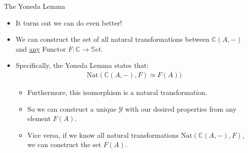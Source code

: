 \documentclass[aspectratio=169]{beamer} %
\newcommand{\bC}{\mathbb{C}}
\newcommand{\bS}{\mathbb{S}}
\newcommand{\mY}{\mathcal{Y}}
\begin{document}
\begin{frame}{The Yoneda Lemma}
    \begin{itemize}
        \item It turns out we can do even better!
        \pause\item We can construct the set of all natural transformations between $\bC(A, -)$ and \underline{any} Functor $F :\bC \to \bS et$.
        \pause\item Specifically, the Yoneda Lemma states that:
        \begin{align*}
          \text{Nat}(\bC(A,-), F) \simeq F(A))
        \end{align*}
        \begin{itemize}
          \vspace{-18pt}\pause\item Furthermore, this isomorphism is a natural transformation.
          \pause\item So we can construct a unique $\mY$ with our desired properties from any element $F(A)$.
          \pause\item Vice versa, if we know all natural transformations $\text{Nat}(\bC(A,-), F)$, we can construct the set $F(A)$.
        \end{itemize}
    \end{itemize}
\end{frame}


\end{document}
